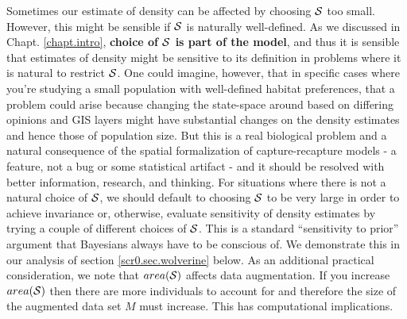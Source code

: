 Sometimes our estimate of density can be affected by choosing ${\cal
  S}$ too small. However, this might be sensible if ${\cal S}$ is
naturally well-defined. As we discussed in Chapt. \ref{chapt.intro},
{\bf choice of ${\cal S}$ is part of the model}, and thus it is
sensible that estimates of density might be sensitive to its
definition in problems where it is natural to restrict ${\cal S}$.
One could imagine, however, that in specific cases where you're
studying a small population with well-defined habitat preferences,
that a problem could arise because changing the state-space around
based on differing opinions and GIS layers might have substantial
changes on the density estimates and hence those of population
size. But this is a real biological problem and a natural consequence
of the spatial formalization of capture-recapture models - a feature,
not a bug or some statistical artifact - and it should be resolved
with better information, research, and thinking.  For situations where
there is not a natural choice of ${\cal S}$, we should default to
choosing ${\cal S}$ to be very large in order to achieve invariance
or, otherwise, evaluate sensitivity of density estimates by trying a
couple of different choices of ${\cal S}$. This is a standard
``sensitivity to prior'' argument that Bayesians always have to be
conscious of.  We demonstrate this in our analysis of section
\ref{scr0.sec.wolverine} below. As an additional practical
consideration, we note that $area({\cal S})$ affects data
augmentation. If you increase $area({\cal S})$ then there are more
individuals to account for and therefore the size of the augmented
data set $M$ must increase. This has computational implications.

